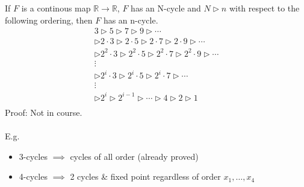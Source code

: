 \documentclass{article}
\begin{document}
If $F$ is a continous map $\mathbb{R} \to \mathbb{R}$, $F$ has an N-cycle
and $N \rhd n$ with respect to the following ordering, then $F$ has an n-cycle.
\begin{equation*}
\begin{array}{c}
3 \rhd 5 \rhd 7 \rhd 9 \rhd \cdots \\
\rhd 2\cdot3 \rhd 2\cdot5 \rhd 2\cdot7 \rhd 2\cdot9 \rhd \cdots \\
\rhd 2^2\cdot3 \rhd 2^2\cdot5 \rhd 2^2\cdot7 \rhd 2^2\cdot9 \rhd \cdots \\
\vdots \\
\rhd 2^i\cdot3 \rhd 2^i\cdot5 \rhd 2^i\cdot7 \rhd \cdots \\
\vdots \\
\rhd 2^i \rhd 2^{i-1} \rhd \cdots \rhd 4 \rhd 2 \rhd 1 \\
\end{array}
\end{equation*}
Proof: Not in course.
\\
\\
E.g. 
\begin{itemize}
\item 3-cycles $\implies$ cycles of all order (already proved)
\item 4-cycles $\implies$ 2 cycles \& fixed point regardless of order 
      $x_1,\dots ,x_4$
\end{itemize}
\end{document}
